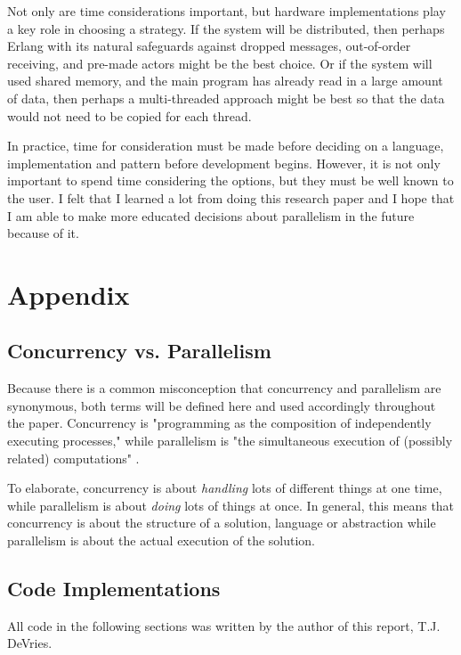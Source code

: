 \documentclass[12pt]{article}
\begin{document}
Not only are time considerations important, but hardware implementations play a key role in choosing a strategy. If the system will be distributed, then perhaps Erlang with its natural safeguards against dropped messages, out-of-order receiving, and pre-made actors might be the best choice. Or if the system will used shared memory, and the main program has already read in a large amount of data, then perhaps a multi-threaded approach might be best so that the data would not need to be copied for each thread.

In practice, time for consideration must be made before deciding on a language, implementation and pattern before development begins. However, it is not only important to spend time considering the options, but they must be well known to the user. I felt that I learned a lot from doing this research paper and I hope that I am able to make more educated decisions about parallelism in the future because of it.

\newpage

\section{Appendix}

\subsection{Concurrency vs. Parallelism}

Because there is a common misconception that concurrency and parallelism are synonymous, both terms will be defined here and used accordingly throughout the paper. Concurrency is "programming as the composition of independently executing processes," while parallelism is "the simultaneous execution of (possibly related) computations" \cite{conc_not_par}.

To elaborate, concurrency is about \textit{handling} lots of different things at one time, while parallelism is about \textit{doing} lots of things at once. In general, this means that concurrency is about the structure of a solution, language or abstraction while parallelism is about the actual execution of the solution. \\

\subsection{Code Implementations}

All code in the following sections was written by the author of this report, T.J. DeVries.
\end{document}
